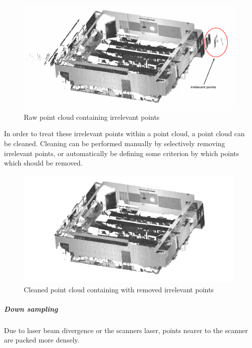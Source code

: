 \documentclass[11pt,a4paper]{report}
\begin{document}
						\begin{figure}[h!]
							\centering
							\includegraphics[width=1\textwidth]{uncleaned_point_cloud}
							\caption{Raw point cloud containing irrelevant points}
							\label{fig:uncleaned_point_cloud}
						\end{figure}
						
						In order to treat these irrelevant points within a point cloud, a point cloud can be cleaned. Cleaning can be performed manually by selectively removing irrelevant points, or automatically be defining some criterion by which points which should be removed.
					
						\begin{figure}[h!]
							\centering
							\includegraphics[width=1\textwidth]{cleaned_point_cloud}
							\caption{Cleaned point cloud containing with removed irrelevant points}
							\label{fig:cleaned_point_cloud}
						\end{figure}
						
					\subparagraph{Down sampling}
						Due to laser beam divergence or the scanners laser, points nearer to the scanner are packed more densely.
						
						
\end{document}
